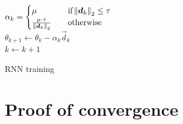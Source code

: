 \begin{algorithm}[]
{		$\alpha_k = 
		\begin{cases}
			\mu  \quad &\mbox{if} \left\Vert \boldsymbol{d}_k \right\Vert_2 \leq \tau\\
			\frac{\mu \cdot \tau}{\left\Vert \boldsymbol{d}_k \right\Vert_2} \quad & \mbox{otherwise}
		\end{cases}$\\
		
		$\theta_{k+1} \gets \theta_k - \alpha_k \vec{d}_k$\\
		$k\gets k+1$
	}
	\caption{RNN training}
	\label{algo:complete_solution}
\end{algorithm}

\section{Proof of convergence}

